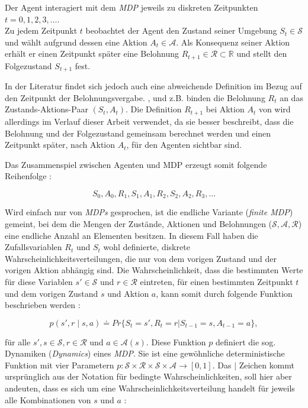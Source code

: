 Der Agent interagiert mit dem \textit{MDP} jeweils zu diskreten Zeitpunkten $t = 0, 1, 2, 3, \dots$. \\
Zu jedem Zeitpunkt $t$ beobachtet der Agent den Zustand seiner Umgebung $S_t \in \mathcal{S}$ und wählt aufgrund dessen eine Aktion $A_t \in \mathcal{A}$. Als Konsequenz seiner Aktion erhält er einen Zeitpunkt später eine Belohnung $R_{t+1} \in \mathcal{R} \subset\mathbb{R} $ und stellt den Folgezustand $S_{t+1}$ fest. 
\par 
In der Literatur findet sich jedoch auch eine abweichende Definition im Bezug auf den Zeitpunkt der Belohnungsvergabe. \cite{watkins1989learning}, \cite{Wiering} und \cite{YuMDP} z.B. binden die Belohnung $R_t$ an das Zustands-Aktions-Paar $(S_t, A_t)$. Die  Definition $R_{t+1}$ bei Aktion $A _{t}$ von \cite{Sutton1998} wird allerdings im Verlauf dieser Arbeit verwendet, da sie besser beschreibt, dass die Belohnung und der Folgezustand gemeinsam berechnet werden und einen Zeitpunkt später, nach Aktion $A_t$, für den Agenten sichtbar sind.
\par 
Das Zusammenspiel zwischen Agenten und MDP erzeugt somit folgende Reihenfolge \cite[~S.48]{Sutton1998}:

\begin{equation}\label{eq:episode}
    S_0, A_0, R_1, S_1, A_1, R_2, S_2, A_2, R_3, \dots
\end{equation}

Wird einfach nur von \textit{MDPs} gesprochen, ist die endliche Variante (\textit{finite MDP}) gemeint, bei dem die Mengen der Zustände, Aktionen und Belohnungen ($\mathcal{S}, \mathcal{A}, \mathcal{R}$) eine endliche Anzahl an Elementen besitzen. In diesem Fall haben die Zufallsvariablen $R_t$ und $S_t$ wohl definierte, diskrete Wahrscheinlichkeitsverteilungen, die nur von dem vorigen Zustand und der vorigen Aktion abhängig sind. Die Wahrscheinlichkeit, dass die bestimmten Werte für diese Variablen $s' \in \mathcal{S}$ und $r \in \mathcal{R}$ eintreten, für einen bestimmten Zeitpunkt $t$ und dem vorigen Zustand $s$ und Aktion $a$, kann somit durch folgende Funktion beschrieben werden \cite[~S.48]{Sutton1998}:

\begin{equation}\label{eq:übergangsfunktion}
p(s',r \mid s,a) \doteq Pr\{S_t=s',R_t=r|S_{t-1}=s,A_{t-1}=a\},
\end{equation}

für alle $s', s \in \mathcal{S}, r \in \mathcal{R}$ und $a \in \mathcal{A}(s)$. Diese Funktion $p$ definiert die sog. Dynamiken (\textit{Dynamics}) eines \textit{MDP}. Sie ist eine gewöhnliche deterministische Funktion mit vier Parametern $p: \mathcal{S} \times \mathcal{R} \times \mathcal{S} \times \mathcal{A} \rightarrow [0,1]$. Das \glqq$\mid$\grqq{} Zeichen kommt ursprünglich aus der Notation für bedingte Wahrscheinlichkeiten, soll hier aber andeuten, dass es sich um eine Wahrscheinlichkeitsverteilung handelt für jeweils alle Kombinationen von $s$ und $a$ \cite[~S.49f]{Sutton1998}:

